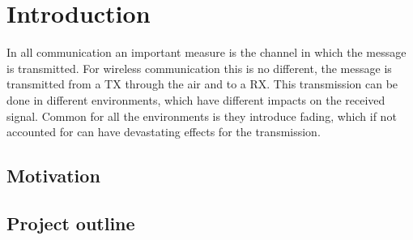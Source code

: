 \chapter{Introduction}

%

In all communication an important measure is the channel in which the message is transmitted. For wireless communication this is no different, the message is transmitted from a \gls{TX} through the air and to a \gls{RX}. This transmission can be done in different environments, which have different impacts on the received signal. Common for all the environments is they introduce fading, which if not accounted for can have devastating effects for the transmission. 



\section{Motivation}






\section{Project outline}





